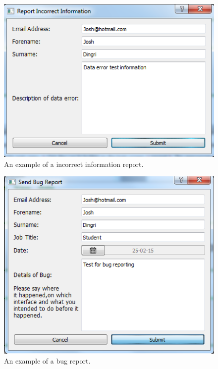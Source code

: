 \begin{figure}[H]
    \includegraphics[width=\textwidth]{./Testing/Images/SubmitErrorReport.png}
    \caption{An example of a incorrect information report.} 
\end{figure}

\begin{figure}[H]
    \includegraphics[width=\textwidth]{./Testing/Images/SubmitBugTest.png}
    \caption{An example of a bug report.} 
\end{figure}


